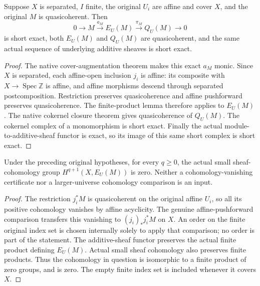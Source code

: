 \begin{theorem}
\label{thm:scheme-affine-effacement-short-exact}
\leanok
{}
Suppose $X$ is separated, $I$ finite, the original $U_i$ are affine
and cover $X$, and the original $M$ is quasicoherent. Then
\[
 0\longrightarrow M\xrightarrow{a_M}E_U(M)
 \xrightarrow{\pi_M}Q_U(M)\longrightarrow0
\]
is short exact, both $E_U(M)$ and $Q_U(M)$ are quasicoherent, and
the same actual sequence of underlying additive sheaves is short exact.
\end{theorem}
\begin{proof}
The native cover-augmentation theorem makes this exact $a_M$ monic.
Since $X$ is separated, each affine-open inclusion $j_i$ is affine:
its composite with $X\to\operatorname{Spec}\mathbb Z$ is affine,
and affine morphisms descend through separated postcomposition.
Restriction preserves quasicoherence and affine pushforward preserves
quasicoherence. The finite-product lemma therefore applies to $E_U(M)$.
The native cokernel closure theorem gives quasicoherence of $Q_U(M)$.
The cokernel complex of a monomorphism is short exact. Finally the
actual module-to-additive-sheaf functor is exact, so its image of this
same short complex is short exact.
\end{proof}

\begin{theorem}
\label{thm:scheme-affine-effacement-acyclic}
\leanok
{}
Under the preceding original hypotheses, for every $q\ge0$,
the actual small sheaf-cohomology group $H^{q+1}(X,E_U(M))$ is zero.
Neither a cohomology-vanishing certificate nor a larger-universe
cohomology comparison is an input.
\end{theorem}
\begin{proof}
The restriction $j_i^*M$ is quasicoherent on the original affine $U_i$,
so all its positive cohomology vanishes by affine acyclicity.
The genuine affine-pushforward comparison transfers this vanishing to
$(j_i)_*j_i^*M$ on $X$. An order on the finite original index set is
chosen internally solely to apply that comparison; no order is part
of the statement. The additive-sheaf functor preserves the actual
finite product defining $E_U(M)$. Actual small sheaf cohomology also
preserves finite products. Thus the cohomology in question is
isomorphic to a finite product of zero groups, and is zero.
The empty finite index set is included whenever it covers $X$.
\end{proof}

